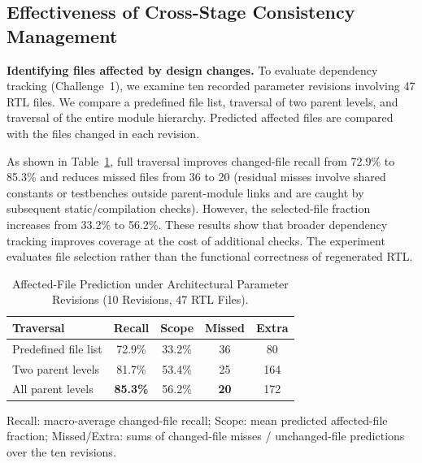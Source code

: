 \documentclass[9pt,conference]{IEEEtran}
\begin{document}
\subsection{Effectiveness of Cross-Stage Consistency Management}
\textbf{Identifying files affected by design changes.}
To evaluate dependency tracking (Challenge~1),
we examine ten recorded parameter revisions
involving 47 RTL files. We compare a predefined
file list, traversal of two parent levels, and
traversal of the entire module hierarchy.
Predicted affected files are compared with the
files changed in each revision.

As shown in Table~\ref{tab:propbench_new},
full traversal improves changed-file recall from
72.9\% to 85.3\% and reduces missed files from
36 to 20 (residual misses involve shared constants or testbenches outside parent-module links and are caught by subsequent static/compilation checks). However, the selected-file fraction
increases from 33.2\% to 56.2\%.
These results show that broader dependency
tracking improves coverage at the cost of
additional checks. The experiment evaluates
file selection rather than the functional
correctness of regenerated RTL.


\begin{table}[t]
\centering
\caption{Affected-File Prediction under Architectural Parameter Revisions (10 Revisions, 47 RTL Files).}
\label{tab:propbench_new}
\footnotesize
\setlength{\tabcolsep}{3pt}
\renewcommand{\arraystretch}{1.10}
\begin{tabular*}{\columnwidth}{@{\extracolsep{\fill}}lcccc@{}}
\toprule
\textbf{Traversal} & \textbf{Recall} & \textbf{Scope} & \textbf{Missed} & \textbf{Extra} \\
\midrule
Predefined file list & 72.9\% & 33.2\% & 36 & 80 \\
Two parent levels & 81.7\% & 53.4\% & 25 & 164 \\
All parent levels & \textbf{85.3\%} & 56.2\% & \textbf{20} & 172 \\
\bottomrule
\end{tabular*}
\vspace{1pt}
{\raggedright\scriptsize Recall: macro-average changed-file recall; Scope: mean predicted affected-file fraction; Missed/Extra: sums of changed-file misses / unchanged-file predictions over the ten revisions.\par}
\vspace{-8pt}
\end{table}
\end{document}
